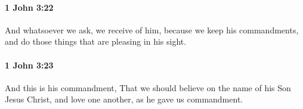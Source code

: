 		\paragraph{1 John 3:22} %
			\label{1JOHN-3-22}

			And whatsoever we ask, we receive of him, because we keep his commandments, and do those things that are pleasing in his sight.

			\begin{framed}
			\scriptsize
				\begin{compactdesc}
					\item[SBLG] 
				\end{compactdesc}
			\end{framed}

		\paragraph{1 John 3:23} %
			\label{1JOHN-3-23}

			And this is his commandment, That we should believe on the name of his Son Jesus Christ, and love one another, as he gave us commandment.

